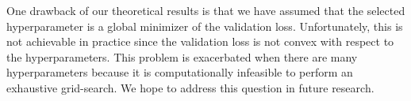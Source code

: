 \documentclass[12pt]{article} %
\theoremstyle{definition}
\begin{document}
One drawback of our theoretical results is that we have assumed that the selected hyperparameter is a global minimizer of the validation loss.
Unfortunately, this is not achievable in practice since the validation loss is not convex with respect to the hyperparameters.
This problem is exacerbated when there are many hyperparameters because it is computationally infeasible to perform an exhaustive grid-search.
We hope to address this question in future research.




\end{document}
